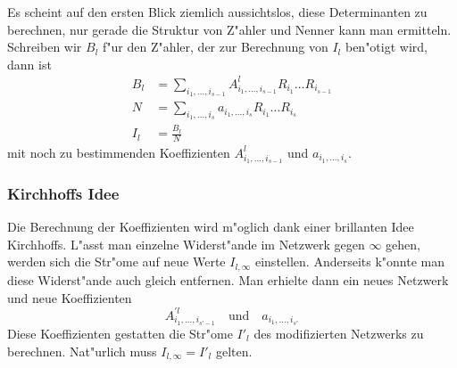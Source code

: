 Es scheint auf den ersten Blick ziemlich aussichtslos, diese
Determinanten zu berechnen, nur gerade die Struktur von Z"ahler
und Nenner kann man ermitteln. Schreiben wir $B_l$ f"ur den 
Z"ahler, der zur Berechnung von $I_l$ ben"otigt wird, dann ist
\begin{align*}
B_l&=\sum_{i_1,\dots,i_{s-1}}A^l_{i_1,\dots,i_{s-1}}R_{i_1}\dots R_{i_{s-1}}\\
N&=\sum_{i_1,\dots,i_s}a_{i_1,\dots,i_s}R_{i_1}\dots R_{i_s}\\
I_l&=\frac{B_l}{N}
\end{align*}
mit noch zu bestimmenden Koeffizienten $A_{i_1,\dots,i_{s-1}}^l$
und $a_{i_1,\dots,i_s}$.

\subsubsection{Kirchhoffs Idee}
Die Berechnung der Koeffizienten wird m"oglich dank einer brillanten
Idee Kirchhoffs. L"asst man einzelne Widerst"ande im Netzwerk gegen
$\infty$ gehen, werden sich die Str"ome auf neue Werte $I_{l,\infty}$
einstellen. Anderseits k"onnte man diese Widerst"ande auch gleich entfernen.
Man erhielte dann ein neues Netzwerk und neue Koeffizienten
\[
A_{i_1,\dots,i_{s'-1}}^{\prime l}
\quad
\text{und}
\quad
a_{i_1,\dots,i_{s'}}
\]
Diese Koeffizienten gestatten die Str"ome $I'_l$ des modifizierten Netzwerks
zu berechnen. Nat"urlich muss $I_{l,\infty}=I'_l$ gelten.

